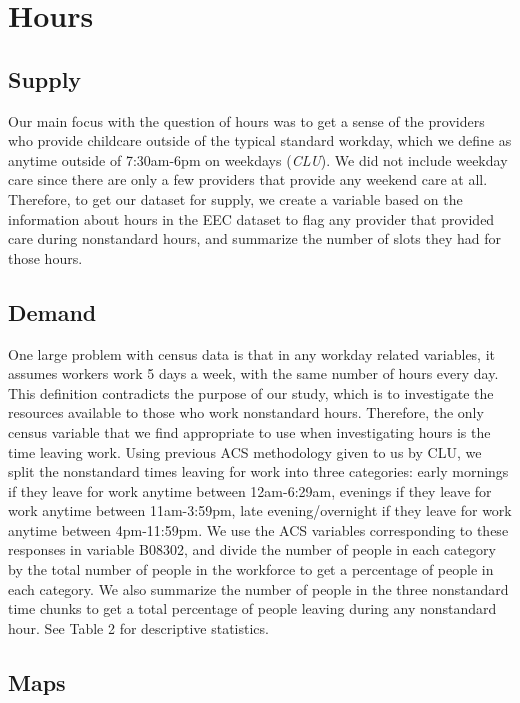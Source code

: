 \documentclass[10pt,letterpaper]{article}
\begin{document}
\section{Hours}\label{hours}

\subsection{Supply}\label{supply-1}

Our main focus with the question of hours was to get a sense of the
providers who provide childcare outside of the typical standard workday,
which we define as anytime outside of 7:30am-6pm on weekdays
(\emph{CLU}). We did not include weekday care since there are only a few
providers that provide any weekend care at all. Therefore, to get our
dataset for supply, we create a variable based on the information about
hours in the EEC dataset to flag any provider that provided care during
nonstandard hours, and summarize the number of slots they had for those
hours.

\subsection{Demand}\label{demand-1}

One large problem with census data is that in any workday related
variables, it assumes workers work 5 days a week, with the same number
of hours every day. This definition contradicts the purpose of our
study, which is to investigate the resources available to those who work
nonstandard hours. Therefore, the only census variable that we find
appropriate to use when investigating hours is the time leaving work.
Using previous ACS methodology given to us by CLU, we split the
nonstandard times leaving for work into three categories: early mornings
if they leave for work anytime between 12am-6:29am, evenings if they
leave for work anytime between 11am-3:59pm, late evening/overnight if
they leave for work anytime between 4pm-11:59pm. We use the ACS
variables corresponding to these responses in variable B08302, and
divide the number of people in each category by the total number of
people in the workforce to get a percentage of people in each category.
We also summarize the number of people in the three nonstandard time
chunks to get a total percentage of people leaving during any
nonstandard hour. See Table 2 for descriptive statistics.

\subsection{Maps}\label{maps-1}
\end{document}
